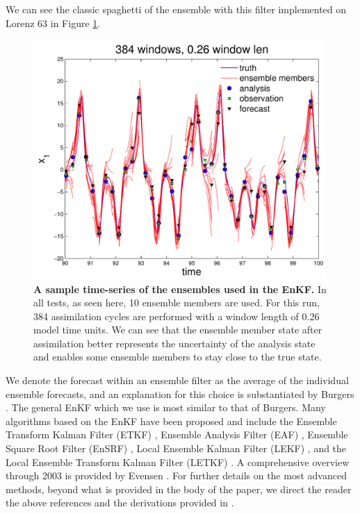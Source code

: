 \documentclass[10pt,letterpaper]{article}
\begin{document}
We can see the classic spaghetti of the ensemble with this filter implemented on Lorenz 63 in Figure \ref{fig:spaghetti}.

\begin{figure}[h]
  \centering
  \includegraphics[width=0.99\textwidth]{fig16_EnKF_spaghetti.pdf}
  \caption[A sample time-series of the ensembles used in the EnKF]{
\textbf{    A sample time-series of the ensembles used in the EnKF.
}    In all tests, as seen here, 10 ensemble members are used.
    For this run, 384 assimilation cycles are performed with a window length of 0.26 model time units.
    We can see that the ensemble member state after assimilation better represents the uncertainty of the analysis state and enables some ensemble members to stay close to the true state.
  }
  \label{fig:spaghetti}
\end{figure}

We denote the forecast within an ensemble filter as the average of the individual ensemble forecasts, and an explanation for this choice is substantiated by Burgers \cite{burgers1998analysis}.
The general EnKF which we use is most similar to that of Burgers.
Many algorithms based on the EnKF have been proposed and include the Ensemble Transform Kalman Filter (ETKF) \cite{ott2004local}, Ensemble Analysis Filter (EAF) \cite{anderson2001new}, Ensemble Square Root Filter (EnSRF) \cite{tippett2003ensemble}, Local Ensemble Kalman Filter (LEKF) \cite{ott2004local}, and the Local Ensemble Transform Kalman Filter (LETKF) \cite{hunt2007efficient}.
A comprehensive overview through 2003 is provided by Evensen \cite{evensen2003ensemble}.
For further details on the most advanced methods, beyond what is provided in the body of the paper, we direct the reader the above references and the derivations provided in \cite{reagan2013}.
\end{document}
